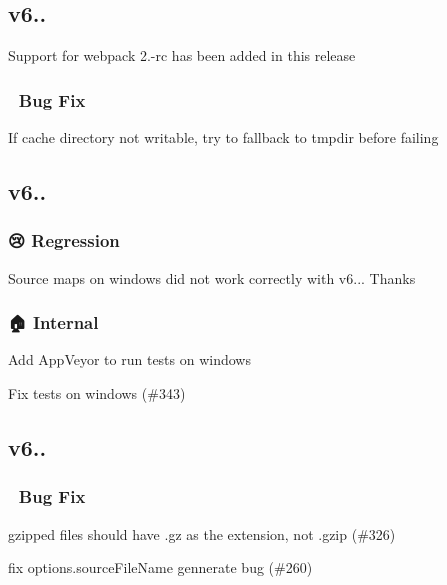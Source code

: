 \subsection*{v6..}

Support for webpack 2.-\/rc has been added in this release

\subsubsection*{🐛 Bug Fix}


\begin{DoxyItemize}
\item If cache directory not writable, try to fallback to tmpdir before failing
\end{DoxyItemize}

\subsection*{v6..}

\subsubsection*{😢 Regression}

Source maps on windows did not work correctly with v6... Thanks 

\subsubsection*{🏠 Internal}


\begin{DoxyItemize}
\item Add App\+Veyor to run tests on windows 
\item Fix tests on windows (\#343) 
\end{DoxyItemize}

\subsection*{v6..}

\subsubsection*{🐛 Bug Fix}


\begin{DoxyItemize}
\item gzipped files should have {\ttfamily .gz} as the extension, not {\ttfamily .gzip} (\#326) 
\item fix options.\+source\+File\+Name gennerate bug (\#260) 
\end{DoxyItemize}

